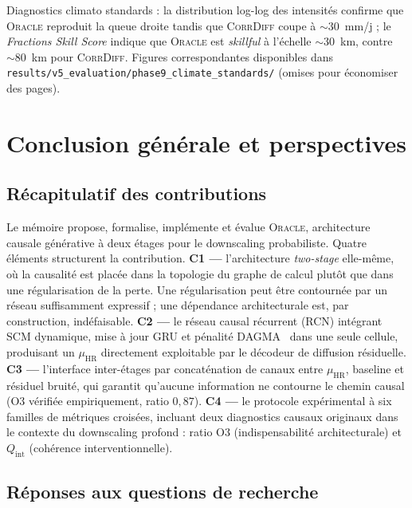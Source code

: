 \documentclass[14pt,a4paper,openany]{extreport}
\theoremstyle{definition}
\newcommand{\Oracle}{\textsc{Oracle}}
\newcommand{\CorrDiff}{\textsc{CorrDiff}}
\newcommand{\HR}{\ensuremath{\text{HR}}}
\newcommand{\muHR}{\ensuremath{\mu_{\HR}}}
\begin{document}
Diagnostics climato standards : la distribution log-log des intensités confirme que \Oracle{} reproduit la queue droite tandis que \CorrDiff{} coupe à $\sim 30$~mm/j ; le \emph{Fractions Skill Score} indique que \Oracle{} est \emph{skillful} à l'échelle $\sim 30$~km, contre $\sim 80$~km pour \CorrDiff{}. Figures correspondantes disponibles dans \texttt{results/v5\_evaluation/phase9\_climate\_standards/} (omises pour économiser des pages).

\cleardoublepage



\chapter*{Conclusion générale et perspectives}

\section*{Récapitulatif des contributions}

Le mémoire propose, formalise, implémente et évalue \Oracle{}, architecture causale générative à deux étages pour le downscaling probabiliste. Quatre éléments structurent la contribution. \textbf{C1 ---} l'architecture \emph{two-stage} elle-même, où la causalité est placée dans la topologie du graphe de calcul plutôt que dans une régularisation de la perte. Une régularisation peut être contournée par un réseau suffisamment expressif ; une dépendance architecturale est, par construction, indéfaisable. \textbf{C2 ---} le réseau causal récurrent (RCN) intégrant SCM dynamique, mise à jour GRU et pénalité DAGMA~\cite{bello_dagma_2022} dans une seule cellule, produisant un $\muHR$ directement exploitable par le décodeur de diffusion résiduelle. \textbf{C3 ---} l'interface inter-étages par concaténation de canaux entre $\muHR$, baseline et résiduel bruité, qui garantit qu'aucune information ne contourne le chemin causal (O3 vérifiée empiriquement, ratio $0{,}87$). \textbf{C4 ---} le protocole expérimental à six familles de métriques croisées, incluant deux diagnostics causaux originaux dans le contexte du downscaling profond : ratio O3 (indispensabilité architecturale) et $Q_{\mathrm{int}}$ (cohérence interventionnelle).

\section*{Réponses aux questions de recherche}
\end{document}
